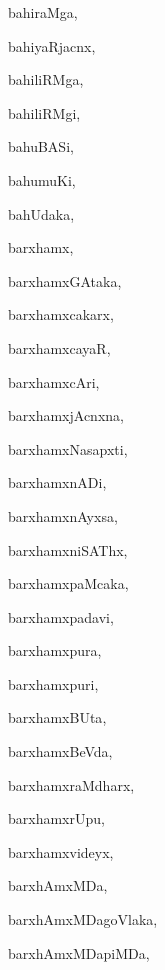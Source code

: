 \begin{multicols}{3}
{\noindent
{bahiraMga}, \pageref{bahiraMga}

\noindent
{bahiyaRjacnx}, \pageref{bahiyaRjacnx}

\noindent
{bahiliRMga}, \pageref{bahiliRMga}

\noindent
{bahiliRMgi}, \pageref{bahiliRMgi}

\noindent
{bahuBASi}, \pageref{bahuBASi}

\noindent
{bahumuKi}, \pageref{bahumuKi}

\noindent
{bahUdaka}, \pageref{bahUdaka}

\noindent
{barxhamx}, \pageref{barxhamx}

\noindent
{barxhamxGAtaka}, \pageref{barxhamxGAtaka}

\noindent
{barxhamxcakarx}, \pageref{barxhamxcakarx}

\noindent
{barxhamxcayaR}, \pageref{barxhamxcayaR}

\noindent
{barxhamxcAri}, \pageref{barxhamxcAri}

\noindent
{barxhamxjAcnxna}, \pageref{barxhamxjAcnxna}

\noindent
{barxhamxNasapxti}, \pageref{barxhamxNasapxti}

\noindent
{barxhamxnADi}, \pageref{barxhamxnADi}

\noindent
{barxhamxnAyxsa}, \pageref{barxhamxnAyxsa}

\noindent
{barxhamxniSAThx}, \pageref{barxhamxniSAThx}

\noindent
{barxhamxpaMcaka}, \pageref{barxhamxpaMcaka}

\noindent
{barxhamxpadavi}, \pageref{barxhamxpadavi}

\noindent
{barxhamxpura}, \pageref{barxhamxpura}

\noindent
{barxhamxpuri}, \pageref{barxhamxpuri}

\noindent
{barxhamxBUta}, \pageref{barxhamxBUta}

\noindent
{barxhamxBeVda}, \pageref{barxhamxBeVda}

\noindent
{barxhamxraMdharx}, \pageref{barxhamxraMdharx}

\noindent
{barxhamxrUpu}, \pageref{barxhamxrUpu}

\noindent
{barxhamxvideyx}, \pageref{barxhamxvideyx}

\noindent
{barxhAmxMDa}, \pageref{barxhAmxMDa}

\noindent
{barxhAmxMDagoVlaka}, \pageref{barxhAmxMDagoVlaka}

\noindent
{barxhAmxMDapiMDa}, \pageref{barxhAmxMDapiMDa}

}
\end{multicols}
